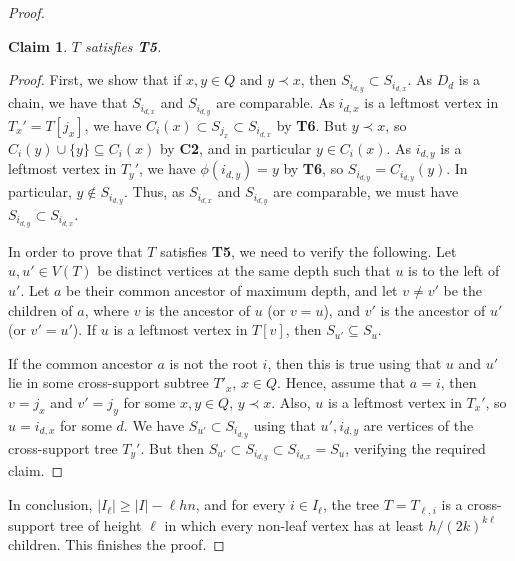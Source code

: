 \documentclass[10pt,a4paper]{amsart}
\newtheorem{claim}{Claim}
\begin{document}
\begin{proof}
\begin{claim}
$T$ satisfies \textbf{T5}.
\end{claim}

\begin{proof}
First, we show that if $x,y\in Q$ and $y\prec x$, then $S_{i_{d,y}}\subset S_{i_{d,x}}$. As $D_d$ is a chain, we have that $S_{i_{d,x}}$ and $S_{i_{d,y}}$ are comparable. As $i_{d,x}$ is a leftmost vertex in $T_x'=T[j_x]$, we have $C_{i}(x)\subset S_{j_x}\subset S_{i_{d,x}}$ by \textbf{T6}. But $y\prec x$, so $C_{i}(y)\cup\{y\}\subseteq C_{i}(x)$ by \textbf{C2}, and in particular $y\in C_i(x)$. As $i_{d,y}$ is a leftmost vertex in $T_{y}'$, we have $\phi(i_{d,y})=y$ by \textbf{T6}, so $S_{i_{d,y}}=C_{i_{d,y}}(y)$. In particular, $y\not\in S_{i_{d,y}}$. Thus, as $S_{i_{d,x}}$ and $S_{i_{d,y}}$ are comparable, we must have $S_{i_{d,y}}\subset S_{i_{d,x}}$.

In order to prove that $T$ satisfies \textbf{T5}, we need to verify the following. Let $u,u'\in V(T)$ be distinct vertices at the same depth such that $u$ is to the left of $u'$. Let $a$ be their common ancestor of maximum depth, and let $v\neq v'$ be the children of $a$, where $v$ is the ancestor of $u$ (or $v=u$), and $v'$ is the ancestor of $u'$ (or $v'=u'$). If $u$ is a leftmost vertex in $T[v]$, then $S_{u'}\subseteq S_u$.

If the common ancestor $a$ is not the root $i$, then this is true using that $u$ and $u'$ lie in some cross-support subtree $T'_x$, $x\in Q$. Hence, assume that $a=i$, then $v=j_x$ and $v'=j_y$ for some $x,y\in Q$, $y\prec x$. Also, $u$ is a leftmost vertex in $T_x'$, so $u=i_{d,x}$ for some $d$. We have $S_{u'}\subset S_{i_{d,y}}$ using that $u',i_{d,y}$ are vertices of the cross-support tree $T_y'$. But then $S_{u'}\subset S_{i_{d,y}}\subset S_{i_{d,x}}=S_u$, verifying the required claim.
\end{proof}

In conclusion, $|I_{\ell}|\geq |I|-\ell h n$, and for every $i\in I_{\ell}$, the tree $T=T_{\ell,i}$ is a cross-support tree of height $\ell$ in which every non-leaf vertex has at least $h/(2k)^{k\ell}$ children. This finishes the proof.
\end{proof}
\end{document}
